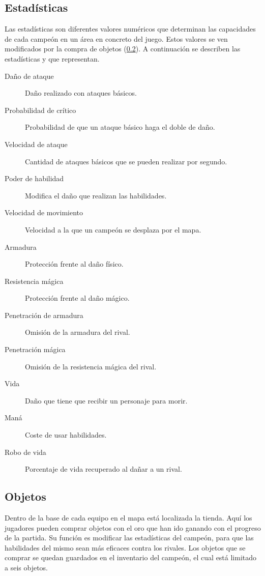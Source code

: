 \subsection{Estadísticas}
\label{estadisticas}
Las estadísticas son diferentes valores numéricos que determinan las capacidades de cada campeón en un área en concreto del juego. Estos valores se ven modificados por la compra de objetos (\ref{objetos}). A continuación se describen las estadísticas y que representan.
\begin{description}
	\item[Daño de ataque] Daño realizado con ataques básicos.
	\item[Probabilidad de crítico] Probabilidad de que un ataque básico haga el doble de daño.
	\item[Velocidad de ataque] Cantidad de ataques básicos que se pueden realizar por segundo.
	\item[Poder de habilidad] Modifica el daño que realizan las habilidades.
	\item[Velocidad de movimiento] Velocidad a la que un campeón se desplaza por el mapa.
	\item[Armadura] Protección frente al daño físico.
	\item[Resistencia mágica] Protección frente al daño mágico.
	\item[Penetración de armadura] Omisión de la armadura del rival.
	\item[Penetración mágica] Omisión de la resistencia mágica del rival.
	\item[Vida] Daño que tiene que recibir un personaje para morir.
	\item[Maná] Coste de usar habilidades.
	\item[Robo de vida] Porcentaje de vida recuperado al dañar a un rival.
\end{description}

\subsection{Objetos}
\label{objetos}
Dentro de la base de cada equipo en el mapa está localizada la tienda. Aquí los jugadores pueden comprar objetos con el oro que han ido ganando con el progreso de la partida. Su función es modificar las estadísticas del campeón, para que las habilidades del mismo sean más eficaces contra los rivales. Los objetos que se comprar se quedan guardados en el inventario del campeón, el cual está limitado a seis objetos.

